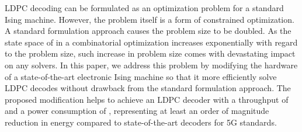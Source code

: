 
LDPC decoding can be formulated as an optimization problem for a standard Ising machine. However, the problem itself is a form of constrained optimization. A standard formulation approach causes the problem size to 
be doubled. 
As the state space of in a combinatorial optimization increases 
exponentially with regard to the problem size, such increase in problem
size comes with devastating impact on any solvers.
In this paper, we address this problem by modifying the hardware of 
a state-of-the-art electronic Ising machine so that it more efficiently
solve LDPC decodes without drawback from the standard formulation approach.
The proposed modification helps to achieve an LDPC decoder with a 
throughput of  and a power consumption of , 
representing at least an order of magnitude reduction in energy compared to state-of-the-art decoders for 5G standards.